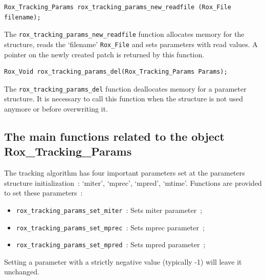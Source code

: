 \begin{lstlisting}
Rox_Tracking_Params rox_tracking_params_new_readfile (Rox_File filename);
\end{lstlisting}
The \lstinline$rox_tracking_params_new_readfile$ function allocates memory for the structure,
reads the `filename' \lstinline$Rox_File$ and sets parameters with read values. A pointer on the newly created patch is returned by this function.\\

\begin{lstlisting}
Rox_Void rox_tracking_params_del(Rox_Tracking_Params Params);
\end{lstlisting}
The \lstinline$rox_tracking_params_del$ function deallocates memory for a parameter structure. It
is necessary to call this function when the structure is not used anymore or before overwriting it.

\subsection{The main functions related to the object Rox\_Tracking\_Params}
\label{sse:tracking_params_functions}

The tracking algorithm has four important parameters set at the parameters structure
initialization~: `miter', `mprec', `mpred', `mtime'. Functions are provided to set these parameters~:

\begin{itemize}
  \item \lstinline$rox_tracking_params_set_miter$~: Sets miter parameter~;
  \item \lstinline$rox_tracking_params_set_mprec$~: Sets mprec parameter~;
  \item \lstinline$rox_tracking_params_set_mpred$~: Sets mpred parameter~;
\end{itemize}

Setting a parameter with a strictly negative value (typically -1) will
leave it unchanged. \\


